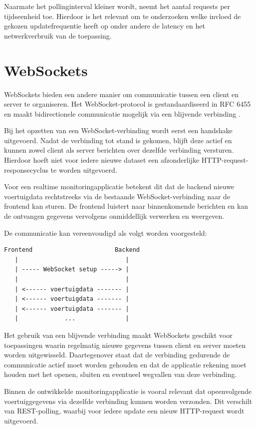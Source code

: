Naarmate het pollinginterval kleiner wordt, neemt het aantal requests per
tijdseenheid toe. Hierdoor is het relevant om te onderzoeken welke invloed de
gekozen updatefrequentie heeft op onder andere de latency en het
netwerkverbruik van de toepassing.

\section{WebSockets}
WebSockets bieden een andere manier om communicatie tussen een client en server
te organiseren. Het WebSocket-protocol is gestandaardiseerd in RFC 6455 en
maakt bidirectionele communicatie mogelijk via een blijvende verbinding
\autocite{RFC6455}.

Bij het opzetten van een WebSocket-verbinding wordt eerst een handshake
uitgevoerd. Nadat de verbinding tot stand is gekomen, blijft deze actief en
kunnen zowel client als server berichten over dezelfde verbinding versturen.
Hierdoor hoeft niet voor iedere nieuwe dataset een afzonderlijke
HTTP-request-responsecyclus te worden uitgevoerd.

Voor een realtime monitoringapplicatie betekent dit dat de backend nieuwe
voertuigdata rechtstreeks via de bestaande WebSocket-verbinding naar de
frontend kan sturen. De frontend luistert naar binnenkomende berichten en kan
de ontvangen gegevens vervolgens onmiddellijk verwerken en weergeven.

De communicatie kan vereenvoudigd als volgt worden voorgesteld:

\begin{verbatim}
Frontend                       Backend
   |                              |
   | ----- WebSocket setup -----> |
   |                              |
   | <------ voertuigdata ------- |
   | <------ voertuigdata ------- |
   | <------ voertuigdata ------- |
   |             ...              |
\end{verbatim}

Het gebruik van een blijvende verbinding maakt WebSockets geschikt voor
toepassingen waarin regelmatig nieuwe gegevens tussen client en server moeten
worden uitgewisseld. Daartegenover staat dat de verbinding gedurende de
communicatie actief moet worden gehouden en dat de applicatie rekening moet
houden met het openen, sluiten en eventueel wegvallen van deze verbinding.

Binnen de ontwikkelde monitoringapplicatie is vooral relevant dat opeenvolgende
voertuiggegevens via dezelfde verbinding kunnen worden verzonden. Dit verschilt
van REST-polling, waarbij voor iedere update een nieuw HTTP-request wordt
uitgevoerd.

